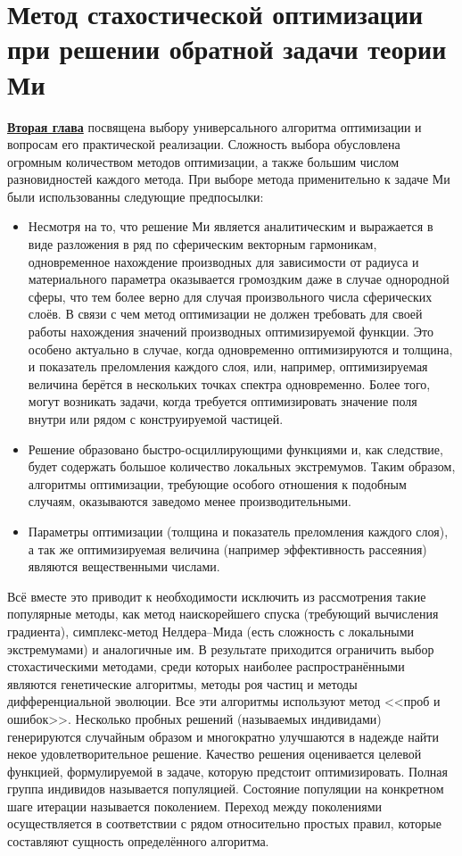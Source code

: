 \chapter{Метод стахостической оптимизации при решении обратной задачи
  теории Ми} \label{chapt2}

\underline{\textbf{Вторая глава}} посвящена выбору универсального
алгоритма оптимизации и вопросам его практической
реализации. Сложность выбора обусловлена огромным количеством методов
оптимизации, а также большим числом разновидностей каждого
метода. При выборе метода применительно к задаче Ми были использованны
следующие предпосылки:
\begin{itemize}
\item Несмотря на то, что решение Ми является аналитическим и
  выражается в виде разложения в ряд по сферическим векторным
  гармоникам, одновременное нахождение производных для зависимости от
  радиуса и материального параметра оказывается громоздким даже в
  случае однородной сферы, что тем более верно для случая
  произвольного числа сферических слоёв.  В связи с чем метод
  оптимизации не должен требовать для своей работы нахождения значений
  производных оптимизируемой функции.  Это особено актуально в случае,
  когда одновременно оптимизируются и толщина, и показатель
  преломления каждого слоя, или, например, оптимизируемая величина
  берётся в нескольких точках спектра одновременно.  Более того, могут
  возникать задачи, когда требуется оптимизировать значение поля внутри
  или рядом с конструируемой частицей.
\item Решение образовано быстро-осциллирующими функциями и, как
  следствие, будет содержать большое количество локальных
  экстремумов. Таким образом, алгоритмы оптимизации, требующие особого
  отношения к подобным случаям, оказываются заведомо менее
  производительными.
\item Параметры оптимизации (толщина и показатель
  преломления каждого слоя), а так же оптимизируемая величина
  (например эффективность рассеяния) являются
  вещественными числами.
\end{itemize}

Всё вместе это приводит к необходимости исключить из рассмотрения
такие популярные методы, как метод наискорейшего спуска (требующий
вычисления градиента), симплекс-метод Нелдера--Мида (есть сложность с
локальными экстремумами) и аналогичные им. В результате приходится
ограничить выбор стохастическими методами, среди которых наиболее
распространёнными являются генетические алгоритмы, методы роя частиц и
методы дифференциальной эволюции.  Все эти алгоритмы используют метод
<<проб и ошибок>>.  Несколько пробных решений (называемых индивидами)
генерируются случайным образом и многократно улучшаются в надежде
найти некое удовлетворительное решение. Качество решения оценивается
целевой функцией, формулируемой в задаче, которую предстоит
оптимизировать.  Полная группа индивидов называется популяцией.
Состояние популяции на конкретном шаге итерации называется поколением.
Переход между поколениями осуществляется в соответствии с рядом
относительно простых правил, которые составляют сущность определённого
алгоритма.

